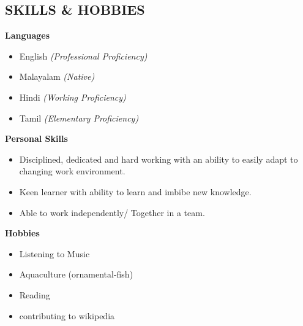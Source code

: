 \documentclass[line, margin]{res}
\begin{document}
\begin{resume}
  \section{SKILLS \& HOBBIES}
  \textbf{ Languages}
  \begin{itemize} \itemsep -2pt
  \item English \textit{(Professional Proficiency)}
  \item Malayalam \textit{(Native)}
  \item Hindi \textit{(Working Proficiency)}
  \item Tamil \textit{(Elementary Proficiency)}
  \end{itemize}
  \textbf{ Personal Skills}
  \begin{itemize} \itemsep -2pt
  \item Disciplined, dedicated and hard working with an ability to easily adapt to changing work environment.
  \item Keen learner with ability to learn and imbibe new knowledge.
  \item Able to work independently/ Together in a team.
  \end{itemize}
  \textbf{ Hobbies}
  \begin{itemize} \itemsep -2pt
  \item Listening to Music
  \item Aquaculture (ornamental-fish)
  \item Reading
  \item contributing to wikipedia
  \end{itemize}
  \vspace{10 mm}

\end{resume}
\end{document}
